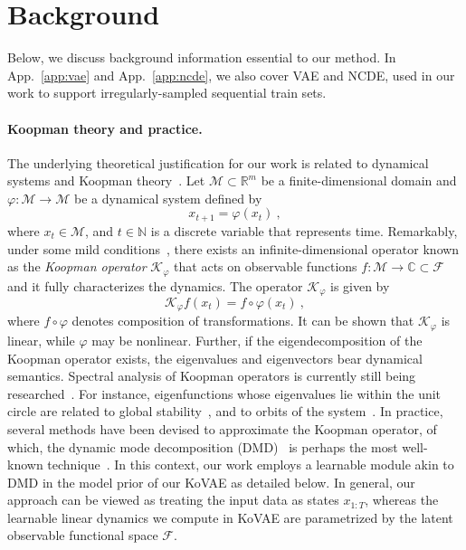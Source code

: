 \documentclass{article} %
\begin{document}
\section{Background}
\label{sec:background}

Below, we discuss background information essential to our method. In App.~\ref{app:vae} and App.~\ref{app:ncde}, we also cover VAE and NCDE, used in our work to support irregularly-sampled sequential train sets.

\paragraph{Koopman theory and practice.} 
The underlying theoretical justification for our work is related to dynamical systems and Koopman theory~\citep{koopman1931hamiltonian}. Let $\mathcal{M} \subset \mathbb{R}^m$ be a finite-dimensional domain and $\varphi: \mathcal{M} \rightarrow \mathcal{M}$ be a dynamical system defined by
\[
    x_{t+1} = \varphi(x_t) \ , 
\]
where $x_t \in \mathcal{M}$, and $t \in \mathbb{N}$ is a discrete variable that represents time. Remarkably, under some mild conditions~\citep{eisner2015operator}, there exists an infinite-dimensional operator known as the \emph{Koopman operator} $\mathcal{K}_\varphi$ that acts on observable functions $f:\mathcal{M} \rightarrow \mathbb{C} \subset \mathcal{F}$ and it fully characterizes the dynamics. The operator $\mathcal{K}_\varphi$ is given by
\[
    \mathcal{K}_\varphi f(x_t) = f \circ \varphi(x_t) \ ,
\]
where $f \circ \varphi$ denotes composition of transformations. It can be shown that $\mathcal{K}_\varphi$ is linear, while $\varphi$ may be nonlinear. Further, if the eigendecomposition of the Koopman operator exists, the eigenvalues and eigenvectors bear dynamical semantics. Spectral analysis of Koopman operators is currently still being researched~\citep{mezic2013analysis, arbabi2017ergodic, mezic2017koopman, das2019delay}. For instance, eigenfunctions whose eigenvalues lie within the unit circle are related to global stability~\citep{mauroy2016global}, and to orbits of the system~\citep{mauroy2013spectral, azencot2013operator, azencot2014functional}.
In practice, several methods have been devised to approximate the Koopman operator, of which, the dynamic mode decomposition (DMD)~\citep{schmid2010dynamic} is perhaps the most well-known technique~\citep{rowley2009spectral}. In this context, our work employs a learnable module akin to DMD in the model prior of our KoVAE as detailed below. In general, our approach can be viewed as treating the input data as states $x_{1:T}$, whereas the learnable linear dynamics we compute in KoVAE are parametrized by the latent observable functional space $\mathcal{F}$.
\end{document}
